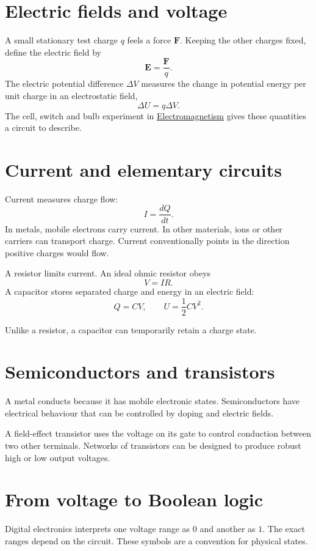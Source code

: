 \section{Electric fields and voltage}

A small stationary test charge $q$ feels
a force $\mathbf{F}$. Keeping the other
charges fixed, define the electric field
by
$$
\mathbf{E}=\frac{\mathbf{F}}{q}.
$$
The electric potential difference
$\Delta V$ measures the change in
potential energy per unit charge in an
electrostatic field,
$$
\Delta U=q\Delta V.
$$
The cell, switch and bulb experiment in
\href{https://www.heap-project.org/%
tag/0HHL}{Electromagnetism}
gives these quantities a circuit to
describe.

\section{Current and elementary circuits}

Current measures charge flow:
$$
I=\frac{dQ}{dt}.
$$
In metals, mobile electrons carry current.
In other materials, ions or other
carriers can transport charge. Current
conventionally points in the direction
positive charges would flow.

A resistor limits current. An ideal
ohmic resistor obeys
$$
V=IR.
$$
A capacitor stores separated charge
and energy in an electric field:
$$
Q=CV,\qquad U=\frac12 CV^2.
$$

Unlike a resistor, a capacitor can
temporarily retain a charge state.

\section{Semiconductors and transistors}

A metal conducts because it has mobile
electronic states. Semiconductors have
electrical behaviour that can be
controlled by doping and electric fields.

A field-effect transistor uses the
voltage on its gate to control conduction
between two other terminals. Networks
of transistors can be designed to
produce robust high or low output
voltages.

\section{From voltage to Boolean logic}
\label{section-inverter}

Digital electronics interprets one
voltage range as $0$ and another as $1$.
The exact ranges depend on the circuit.
These symbols are a convention for
physical states.

